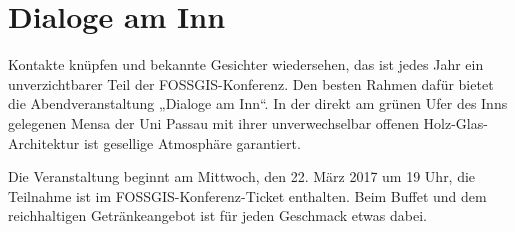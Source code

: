 \thispagestyle{cropmarksstyle}
\section*{Dialoge am Inn}
\label{social-event}
Kontakte knüpfen und bekannte Gesichter wiedersehen, das ist jedes Jahr ein unverzichtbarer Teil der
FOSSGIS-Konferenz. Den besten Rahmen dafür bietet die Abendveranstaltung „Dialoge am Inn“. In der
direkt am grünen Ufer des Inns gelegenen Mensa der Uni Passau mit ihrer unverwechselbar offenen
Holz-Glas-Architektur ist gesellige Atmosphäre garantiert.

Die Veranstaltung beginnt am Mittwoch, den 22. März 2017 um 19 Uhr, die Teilnahme ist im
FOSSGIS-Konferenz-Ticket enthalten. Beim Buffet und dem reichhaltigen Getränkeangebot ist für jeden
Geschmack etwas dabei.
\newpage
